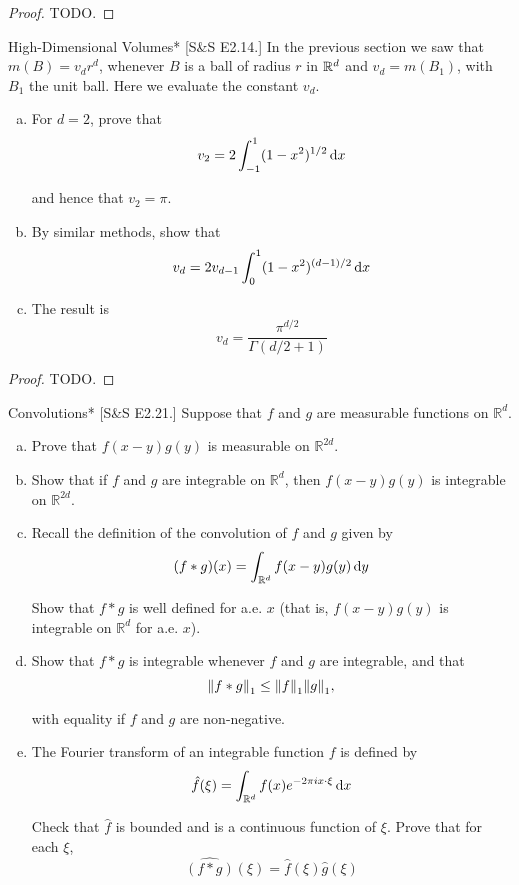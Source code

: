 \begin{proof}
    TODO. 
\end{proof}


\begin{problem}{High-Dimensional Volumes}*
    [S\&S E2.14.] In the previous section we saw that \(m(B) = v_d r^d\), whenever \(B\) is a ball of radius \(r\) in \(\mathbb{R}^d\) and \(v_d = m(B_1)\), with \(B_1\) the unit ball. Here we evaluate the constant \(v_d\).
    \begin{enumerate}[(a)]
        \itemsep0em
        \item For \(d = 2\), prove that 
        \[
            v_2 = 2 \int_{-1}^1 (1 - x^2)^{1/2} \, \mathrm{d}x
        \]

        and hence that \(v_2 = \pi\). 
        \item By similar methods, show that 
        \[
            v_d = 2v_{d-1} \int_0^1 (1 - x^2)^{(d-1)/2} \, \mathrm{d}x
        \]

        \item The result is 
        \[
            v_d = \frac{\pi^{d/2}}{\Gamma(d/2 + 1)}
        \]
    \end{enumerate}
\end{problem}

\begin{proof}
    TODO. 
\end{proof}


\begin{problem}{Convolutions}*
    [S\&S E2.21.] Suppose that \( f \) and \( g \) are measurable functions on \( \mathbb{R}^d \).
    \begin{enumerate}[(a)]
        \itemsep0em
        \item Prove that \( f(x - y)g(y) \) is measurable on \( \mathbb{R}^{2d} \).
        \item Show that if \( f \) and \( g \) are integrable on \( \mathbb{R}^d \), then \( f(x - y)g(y) \) is integrable on \( \mathbb{R}^{2d} \).
        \item Recall the definition of the convolution of \( f \) and \( g \) given by
        \[
            (f * g)(x) = \int_{\mathbb{R}^d} f(x - y)g(y) \, \mathrm{d}y
        \]

        Show that \( f * g \) is well defined for a.e. \( x \) (that is, \( f(x - y)g(y) \) is integrable on \( \mathbb{R}^d \) for a.e. \( x \)).
        \item Show that \( f * g \) is integrable whenever \( f \) and \( g \) are integrable, and that
        \[
            \norm{f*g}_1 \leq \norm{f}_1 \norm{g}_1,
        \]

        with equality if \( f \) and \( g \) are non-negative.
        \item The Fourier transform of an integrable function \( f \) is defined by
        \[
            \hat{f}(\xi) = \int_{\mathbb{R}^d} f(x)e^{-2\pi i x \cdot \xi} \, \mathrm{d}x
        \]

        Check that \( \hat{f} \) is bounded and is a continuous function of \( \xi \). Prove that for each \( \xi \),
        \[
            \widehat{(f * g)}(\xi) = \hat{f}(\xi)\hat{g}(\xi)
        \]
    \end{enumerate}
\end{problem}

